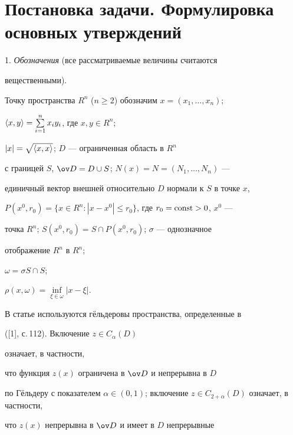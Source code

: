 

\maketitle 


\label{begin} 


 


\section{Постановка задачи. Формулировка основных утверждений} 


 


1. {\it Обозначения} (все рассматриваемые величины считаются 


вещественными). 


Точку пространства $R^n$ ($n\ge2$) обозначим $x=(x_1,\dotsc,x_n)$; 


$\langle x,y\rangle=\sum\limits^n_{i=1}x_i y_i$, где $x,y\in R^n$; 


$|x|=\sqrt{\langle x,x\rangle}$; $D$ --- ограниченная область в $R^n$ 


с границей $S$, $\ov D=D\cup S$; $N(x)=N=(N_1,\dotsc,N_n)$ --- 


единичный вектор внешней относительно $D$ нормали к $S$ в точке $x$, 


$P(x^0,r_0)=\{x\in R^n:|x-x^0|\le r_0\}$, где $r_0=\operatorname{const}>0$, $x^0$ --- 


точка $R^n$; $S(x^0,r_0)=S\cap P(x^0,r_0)$; $\sigma$ --- однозначное 


отображение $R^n$ в $R^n$; 


$\omega=\sigma S\cap S$; 


$\rho(x,\omega)=\inf\limits_{\xi\in\omega}|x-\xi|$. 


 


В статье используются г\"ельдеровы пространства, определенные в 


([1], с.\,112). Включение $z\in C_\alpha(D)$ 


означает, в частности,


что функция $z(x)$ ограничена в $\ov D$ и непрерывна в $D$ 


по Г\"ельдеру с показателем $\alpha\in(0,1)$; включение $z\in 


C_{2+\alpha}(D)$ означает, в частности, 


что $z(x)$ непрерывна в $\ov D$ и имеет в $D$ непрерывные 


